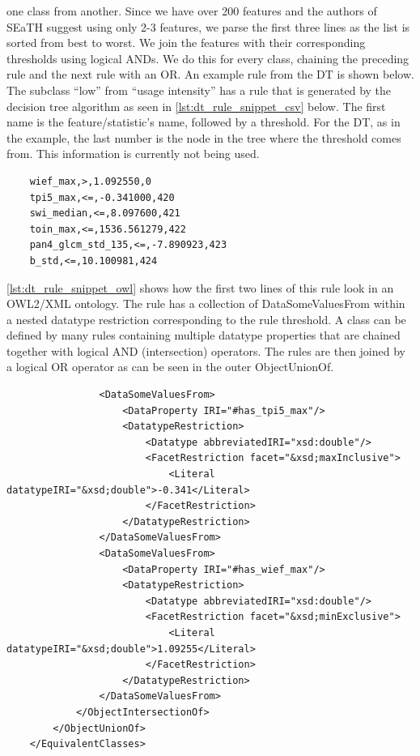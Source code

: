 \documentclass[authoryear,preprint,12pt,number]{elsarticle}
\begin{document}
one class from another. Since we have over 200 features and the authors of 
SEaTH suggest using only 2-3 features, we parse the first three lines as the 
list is sorted from best to worst. We join the features with their 
corresponding thresholds using logical ANDs. We do this for every class, 
chaining the preceding rule and the next rule with an OR. An example rule from 
the DT is shown below.
\\
The subclass ``low'' from ``usage intensity'' has a rule that is generated by
the decision tree algorithm as seen in \ref{lst:dt_rule_snippet_csv} below. 
The first name is the feature/statistic's name, followed by a threshold. For 
the DT, as in the example, the last number is the node in the tree where the 
threshold comes from. This information is currently not being used.
\label{lst:dt_rule_snippet_csv}
\begin{lstlisting}
    wief_max,>,1.092550,0
    tpi5_max,<=,-0.341000,420
    swi_median,<=,8.097600,421
    toin_max,<=,1536.561279,422
    pan4_glcm_std_135,<=,-7.890923,423
    b_std,<=,10.100981,424
\end{lstlisting}
\ref{lst:dt_rule_snippet_owl} shows how the first two 
lines of this rule look in an OWL2/XML ontology. The rule has a collection of 
DataSomeValuesFrom within a nested datatype restriction corresponding to the 
rule threshold. A class can be defined by many rules containing multiple 
datatype properties that are chained together with logical AND (intersection) 
operators. The rules are then joined by a logical OR operator as can be seen in 
the outer ObjectUnionOf.  
\label{lst:dt_rule_snippet_owl}
\begin{lstlisting}
                <DataSomeValuesFrom>
                    <DataProperty IRI="#has_tpi5_max"/>
                    <DatatypeRestriction>
                        <Datatype abbreviatedIRI="xsd:double"/>
                        <FacetRestriction facet="&xsd;maxInclusive">
                            <Literal datatypeIRI="&xsd;double">-0.341</Literal>
                        </FacetRestriction>
                    </DatatypeRestriction>
                </DataSomeValuesFrom>
                <DataSomeValuesFrom>
                    <DataProperty IRI="#has_wief_max"/>
                    <DatatypeRestriction>
                        <Datatype abbreviatedIRI="xsd:double"/>
                        <FacetRestriction facet="&xsd;minExclusive">
                            <Literal datatypeIRI="&xsd;double">1.09255</Literal>
                        </FacetRestriction>
                    </DatatypeRestriction>
                </DataSomeValuesFrom>
            </ObjectIntersectionOf>
        </ObjectUnionOf>
    </EquivalentClasses>
\end{lstlisting}
\end{document}
